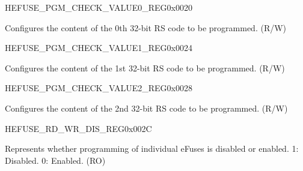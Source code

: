 \begin{register}{H}{EFUSE\_PGM\_CHECK\_VALUE0\_REG}{0x0020}\label{regdesc:EFUSEPGMCHECKVALUE0REG}
%
\regnewline%
\begin{regdesc}\begin{reglist}
\label{fielddesc:EFUSEPGMRSDATA0}\item [EFUSE\_PGM\_RS\_DATA\_0] Configures the content of the 0th 32-bit RS code to be programmed. (R/W)
\end{reglist}\end{regdesc}
\end{register}


\begin{register}{H}{EFUSE\_PGM\_CHECK\_VALUE1\_REG}{0x0024}\label{regdesc:EFUSEPGMCHECKVALUE1REG}
%
\regnewline%
\begin{regdesc}\begin{reglist}
\label{fielddesc:EFUSEPGMRSDATA1}\item [EFUSE\_PGM\_RS\_DATA\_1] Configures the content of the 1st 32-bit RS code to be programmed. (R/W)
\end{reglist}\end{regdesc}
\end{register}


\begin{register}{H}{EFUSE\_PGM\_CHECK\_VALUE2\_REG}{0x0028}\label{regdesc:EFUSEPGMCHECKVALUE2REG}
%
\regnewline%
\begin{regdesc}\begin{reglist}
\label{fielddesc:EFUSEPGMRSDATA2}\item [EFUSE\_PGM\_RS\_DATA\_2] Configures the content of the 2nd 32-bit RS code to be programmed. (R/W)
\end{reglist}\end{regdesc}
\end{register}


\begin{register}{H}{EFUSE\_RD\_WR\_DIS\_REG}{0x002C}\label{regdesc:EFUSERDWRDISREG}
%
%
\regnewline%
\begin{regdesc}\begin{reglist}
\label{fielddesc:EFUSEWRDIS}\item [EFUSE\_WR\_DIS] Represents whether programming of individual eFuses is disabled or enabled. 1: Disabled. 0: Enabled. (RO)
\end{reglist}\end{regdesc}
\end{register}


